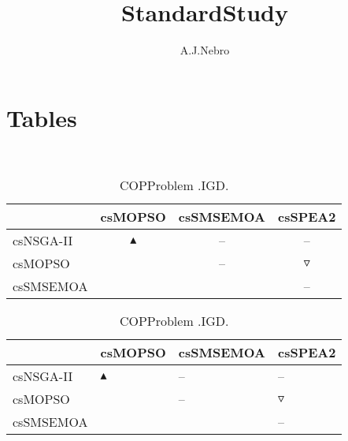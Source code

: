 \documentclass{article}
\title{StandardStudy}
\author{A.J.Nebro}
\begin{document}
\maketitle
\section{Tables}
\
\begin{table}
\caption{
COPProblem
.IGD.}
\label{Table:
COPProblem
.IGD.}
\centering
\begin{scriptsize}
\begin{tabular}{
lccc
}
\hline  & csMOPSO & csSMSEMOA & csSPEA2\\ 
\hline 
csNSGA-II
 & 
$\blacktriangle$
 & 
--
 & 
--
 \\ 
csMOPSO
 & 
  
 & 
--
 & 
$\triangledown$
 \\ 
csSMSEMOA
 & 
 
 & 
  
 & 
--
 \\ 
\hline
\end{tabular}
\end{scriptsize}
\end{table}
\begin{table}
\caption{
COPProblem 
.IGD.}
\label{Table:
COPProblem 
.IGD.}
\centering
\begin{scriptsize}
\begin{tabular}{
| l | p{0.15cm}   | p{0.15cm}   | p{0.15cm}   | 
}
\hline \multicolumn{1}{|c|}{} & \multicolumn{1}{c|}{csMOPSO} & \multicolumn{1}{c|}{csSMSEMOA} & \multicolumn{1}{c|}{csSPEA2} \\
\hline 
csNSGA-II
 & 
$\blacktriangle$
 & 
--
 & 
--
 \\ 
csMOPSO
 & 
  
 & 
--
 & 
$\triangledown$
 \\ 
csSMSEMOA
 & 
 
 & 
  
 & 
--
 \\ 
\hline
\end{tabular}
\end{scriptsize}
\end{table}
\end{document}
